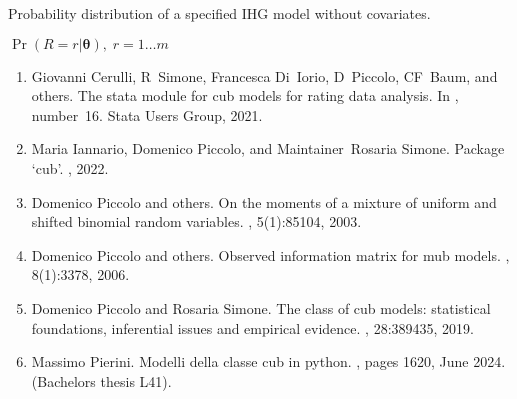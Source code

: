 \documentclass[letterpaper,10pt,english]{sphinxmanual}
\begin{document}

\begin{fulllineitems}
\label{\detokenize{cubmods:cubmods.ihg.pmf}}
\pysigstartsignatures
{}
\pysigstopsignatures
\sphinxAtStartPar
Probability distribution of a specified IHG model without covariates.

\sphinxAtStartPar
\(\Pr(R = r | \pmb\theta),\; r=1 \ldots m\)
\begin{description}
\begin{enumerate}
%
\setcounter{enumi}{0}
\item {} 
\sphinxAtStartPar
Giovanni Cerulli, R Simone, Francesca Di Iorio, D Piccolo, CF Baum, and others. The stata module for cub models for rating data analysis. In , number 16. Stata Users Group, 2021.

\item {} 
\sphinxAtStartPar
Maria Iannario, Domenico Piccolo, and Maintainer Rosaria Simone. Package ‘cub’. , 2022.

\item {} 
\sphinxAtStartPar
Domenico Piccolo and others. On the moments of a mixture of uniform and shifted binomial random variables. , 5(1):85\textendash{}104, 2003.

\item {} 
\sphinxAtStartPar
Domenico Piccolo and others. Observed information matrix for mub models. , 8(1):33\textendash{}78, 2006.

\item {} 
\sphinxAtStartPar
Domenico Piccolo and Rosaria Simone. The class of cub models: statistical foundations, inferential issues and empirical evidence. , 28:389\textendash{}435, 2019.

\item {} 
\sphinxAtStartPar
Massimo Pierini. Modelli della classe cub in python. , pages 16\textendash{}20, June 2024. (Bachelor\textquotesingle{}s thesis L\sphinxhyphen{}41).


\end{enumerate}
\end{description}
\end{fulllineitems}
\end{document}
